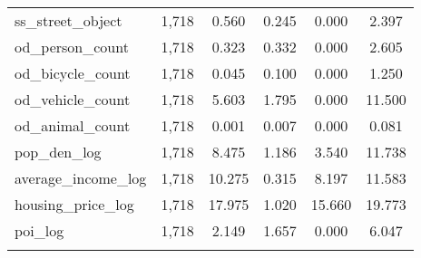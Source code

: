 \begin{table}[!htbp]
\begin{tabular}{@{\extracolsep{5pt}}lccccc}
ss\_street\_object & 1,718 & 0.560 & 0.245 & 0.000 & 2.397 \\ 
od\_person\_count & 1,718 & 0.323 & 0.332 & 0.000 & 2.605 \\ 
od\_bicycle\_count & 1,718 & 0.045 & 0.100 & 0.000 & 1.250 \\ 
od\_vehicle\_count & 1,718 & 5.603 & 1.795 & 0.000 & 11.500 \\ 
od\_animal\_count & 1,718 & 0.001 & 0.007 & 0.000 & 0.081 \\ 
pop\_den\_log & 1,718 & 8.475 & 1.186 & 3.540 & 11.738 \\ 
average\_income\_log & 1,718 & 10.275 & 0.315 & 8.197 & 11.583 \\ 
housing\_price\_log & 1,718 & 17.975 & 1.020 & 15.660 & 19.773 \\ 
poi\_log & 1,718 & 2.149 & 1.657 & 0.000 & 6.047 \\ 
\hline \\[-1.8ex] 
\end{tabular} 
\end{table} 
